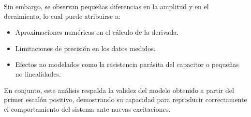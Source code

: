 \documentclass{article}
\begin{document}
Sin embargo, se observan pequeñas diferencias en la amplitud y en el decaimiento, lo cual puede atribuirse a:
\begin{itemize}
    \item Aproximaciones numéricas en el cálculo de la derivada.
    \item Limitaciones de precisión en los datos medidos.
    \item Efectos no modelados como la resistencia parásita del capacitor o pequeñas no linealidades.
\end{itemize}

En conjunto, este análisis respalda la validez del modelo obtenido a partir del primer escalón positivo, demostrando su capacidad para reproducir correctamente el comportamiento del sistema ante nuevas excitaciones.
\end{document}
